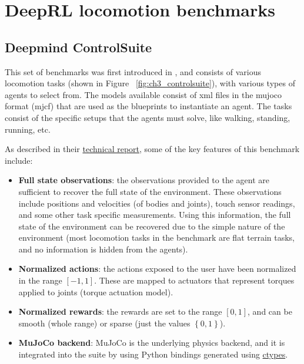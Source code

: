 
\section{DeepRL locomotion benchmarks}

\subsection{Deepmind ControlSuite}

This set of benchmarks was first introduced in \cite{Controlsuite}, and consists 
of various locomotion tasks (shown in Figure ~\ref{fig:ch3_controlsuite}), with various types of agents 
to select from. The models available consist of xml files in the mujoco format (mjcf) 
that are used as the blueprints to instantiate an agent. The tasks consist of the specific
setups that the agents must solve, like walking, standing, running, etc.

\figBenchmarkControlSuite

As described in their \href{https://arxiv.org/pdf/1801.00690.pdf}{technical report},
some of the key features of this benchmark include:

\begin{itemize}
    \item \textbf{Full state observations}: the observations provided to the agent
          are sufficient to recover the full state of the environment. These observations
          include positions and velocities (of bodies and joints), touch sensor readings,
          and some other task specific measurements. Using this information, the full state
          of the environment can be recovered due to the simple nature of the environment 
          (most locomotion tasks in the benchmark are flat terrain tasks, and no information
          is hidden from the agents).

    \item \textbf{Normalized actions}: the actions exposed to the user have been normalized 
          in the range $\left[-1,1\right]$. These are mapped to actuators that represent
          torques applied to joints (torque actuation model).

    \item \textbf{Normalized rewards}: the rewards are set to the range $\left[ 0, 1 \right]$, 
          and can be smooth (whole range) or sparse (just the values $\left\{0,1\right\}$).

    \item \textbf{MuJoCo backend}: MuJoCo is the underlying physics backend, and it is
          integrated into the suite by using Python bindings generated using 
          \href{https://github.com/deepmind/dm_control/blob/master/dm_control/autowrap/autowrap.py}{ctypes}.
\end{itemize}

